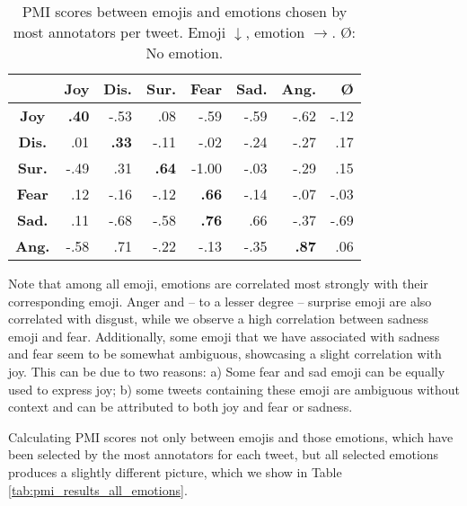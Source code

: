 \documentclass[10pt, a4paper]{article}
\begin{document}
\begin{table}[!ht]
\centering
\begin{tabular}{c | r | r | r | r | r | r | r}
 & \textbf{Joy} & \textbf{Dis.} & \textbf{Sur.} & \textbf{Fear} & \textbf{Sad.} & \textbf{Ang.} & \textbf{\O} \\\hline
\textbf{Joy} & \textbf{.40} & -.53 & .08 & -.59 & -.59 & -.62 & -.12 \\
\textbf{Dis.} & .01 & \textbf{.33} & -.11 & -.02 & -.24 & -.27 & .17 \\
\textbf{Sur.} & -.49 & .31 & \textbf{.64} & -1.00 & -.03 & -.29 & .15 \\
\textbf{Fear} & .12 & -.16 & -.12 & \textbf{.66} & -.14 & -.07 & -.03 \\
\textbf{Sad.} & .11 & -.68 & -.58 & \textbf{.76} & .66 & -.37 & -.69 \\
\textbf{Ang.} & -.58 & .71 & -.22 & -.13 & -.35 & \textbf{.87} & .06
\end{tabular}
\caption{PMI scores between emojis and emotions chosen by most annotators per tweet. Emoji $\downarrow$, emotion $\rightarrow$. \O: No emotion.}
\label{tab:pmi_results_top_emotions}
\end{table}

Note that among all emoji, emotions are correlated most strongly with their corresponding emoji. Anger and -- to a lesser degree -- surprise emoji are also correlated with disgust, while we observe a high correlation between sadness emoji and fear. Additionally, some emoji that we have associated with sadness and fear seem to be somewhat ambiguous, showcasing a slight correlation with joy. This can be due to two reasons: a) Some fear and sad emoji can be equally used to express joy; b) some tweets containing these emoji are ambiguous without context and can be attributed to both joy and fear or sadness.

Calculating PMI scores not only between emojis and those emotions, which have been selected by the most annotators for each tweet, but all selected emotions produces a slightly different picture, which we show in Table \ref{tab:pmi_results_all_emotions}.
\end{document}
